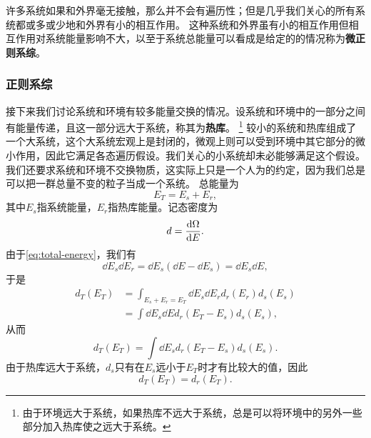 \documentclass[hyperref, UTF8, a4paper]{ctexart}
\begin{document}
许多系统如果和外界毫无接触，那么并不会有遍历性；但是几乎我们关心的所有系统都或多或少地和外界有小的相互作用。
这种系统和外界虽有小的相互作用但相互作用对系统能量影响不大，以至于系统总能量可以看成是给定的的情况称为\textbf{微正则系综}。

\subsubsection{正则系综}

接下来我们讨论系统和环境有较多能量交换的情况。设系统和环境中的一部分之间有能量传递，且这一部分远大于系统，称其为\textbf{热库}。%
\footnote{由于环境远大于系统，如果热库不远大于系统，总是可以将环境中的另外一些部分加入热库使之远大于系统。}%
较小的系统和热库组成了一个大系统，这个大系统宏观上是封闭的，微观上则可以受到环境中其它部分的微小作用，因此它满足各态遍历假设。我们关心的小系统却未必能够满足这个假设。
我们还要求系统和环境不交换物质，这实际上只是一个人为的约定，因为我们总是可以把一群总量不变的粒子当成一个系统。%
总能量为
\begin{equation}
    E_T = E_s + E_r,
    \label{eq:total-energy}
\end{equation}
其中$E_s$指系统能量，$E_r$指热库能量。记态密度为 %
\begin{equation}
    d = \dv{\Omega}{E}.
\end{equation}
由于\eqref{eq:total-energy}，我们有
\[
    \dd{E_s} \dd{E_r} = \dd{E_s} (\dd{E} - \dd{E_s}) = \dd{E_s} \dd{E},
\]
于是
\[
    \begin{aligned}
        d_T (E_T) &= \int_{E_s + E_r = E_T} \dd{E_s} \dd{E_r} d_r (E_r) d_s (E_s) \\
        &= \int \dd{E_s} \dd{E} d_r (E_T - E_s) d_s (E_s),
    \end{aligned}
\]
从而
\[
    d_T (E_T) = \int \dd{E_s} d_r (E_T - E_s) d_s (E_s).
\]
由于热库远大于系统，$d_s$只有在$E_s$远小于$E_T$时才有比较大的值，因此
\begin{equation}
    d_T (E_T) = d_r (E_T).
\end{equation}
\end{document}
